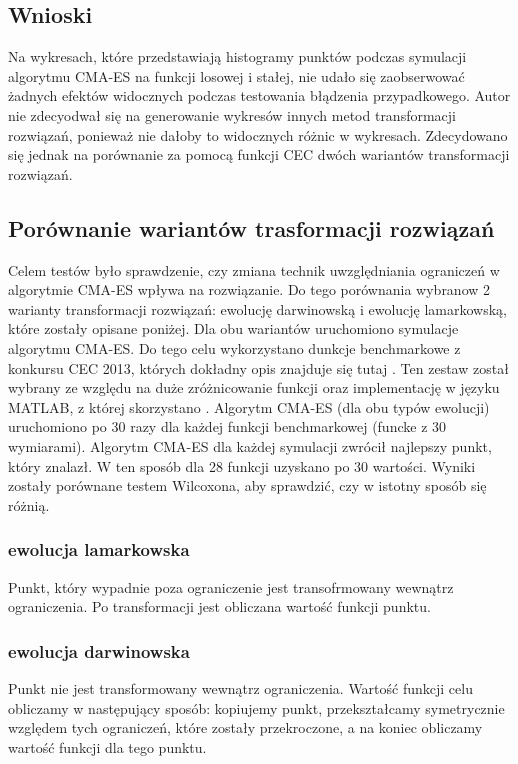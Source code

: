 \documentclass{mini}
\begin{document}
\subsection{Wnioski}
Na wykresach, które przedstawiają histogramy punktów podczas symulacji algorytmu CMA-ES na funkcji losowej i stałej, nie udało się zaobserwować żadnych efektów widocznych podczas testowania błądzenia przypadkowego. Autor nie zdecyodwał się na generowanie wykresów innych metod transformacji rozwiązań, ponieważ nie dałoby to widocznych różnic w wykresach. Zdecydowano się jednak na porównanie za pomocą funkcji CEC dwóch wariantów transformacji rozwiązań.

\subsection{Porównanie wariantów trasformacji rozwiązań}
Celem testów było sprawdzenie, czy zmiana technik uwzględniania ograniczeń w algorytmie CMA-ES wpływa na rozwiązanie. Do tego porównania wybranow 2 warianty transformacji rozwiązań: ewolucję darwinowską i ewolucję lamarkowską, które zostały opisane poniżej. Dla obu wariantów uruchomiono symulacje algorytmu CMA-ES. Do tego celu wykorzystano dunkcje benchmarkowe z konkursu CEC 2013, których dokładny opis znajduje się tutaj \cite{cec}. Ten zestaw został wybrany ze względu na duże zróżnicowanie funkcji oraz implementację w języku MATLAB, z której skorzystano \cite{cec_code}. Algorytm CMA-ES (dla obu typów ewolucji) uruchomiono po 30 razy dla każdej funkcji benchmarkowej (funcke z 30 wymiarami). Algorytm CMA-ES dla każdej symulacji zwrócił najlepszy punkt, który znalazł. W ten sposób dla 28 funkcji uzyskano po 30 wartości. Wyniki zostały porównane testem Wilcoxona, aby sprawdzić, czy w istotny sposób się różnią.

\subsubsection*{ewolucja lamarkowska}
Punkt, który wypadnie poza ograniczenie jest transofrmowany wewnątrz ograniczenia. Po transformacji jest obliczana wartość funkcji punktu.

\subsubsection*{ewolucja darwinowska}
Punkt nie jest transformowany wewnątrz ograniczenia. Wartość funkcji celu obliczamy w następujący sposób: kopiujemy punkt, przekształcamy symetrycznie względem tych ograniczeń, które zostały przekroczone, a na koniec obliczamy wartość funkcji dla tego punktu.
\end{document}
